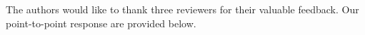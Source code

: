 \documentclass{article}
\begin{document}
The authors would like to thank three reviewers for their valuable feedback. 
Our point-to-point response are provided below.






    
\end{document}
